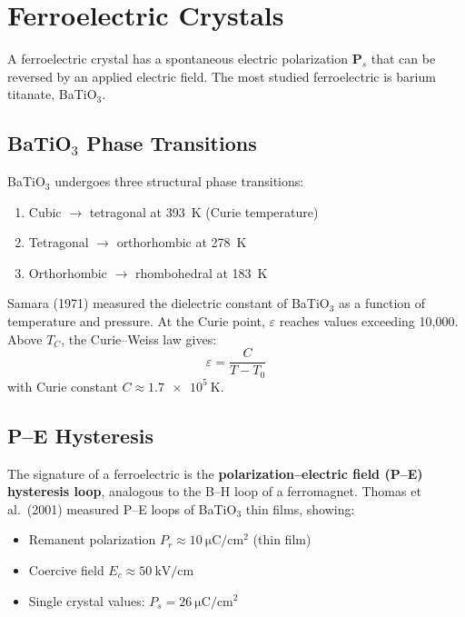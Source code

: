 \section{Ferroelectric Crystals}

A ferroelectric crystal has a spontaneous electric polarization $\mathbf{P}_s$ that can be reversed by an applied electric field. The most studied ferroelectric is barium titanate, BaTiO$_3$.

\subsection{BaTiO$_3$ Phase Transitions}

BaTiO$_3$ undergoes three structural phase transitions:
\begin{enumerate}[nosep]
  \item Cubic $\to$ tetragonal at \SI{393}{\kelvin} (Curie temperature)
  \item Tetragonal $\to$ orthorhombic at \SI{278}{\kelvin}
  \item Orthorhombic $\to$ rhombohedral at \SI{183}{\kelvin}
\end{enumerate}

Samara (1971) measured the dielectric constant of BaTiO$_3$ as a function of temperature and pressure. At the Curie point, $\varepsilon$ reaches values exceeding 10,000. Above $T_C$, the Curie--Weiss law gives:
\begin{equation}
  \varepsilon = \frac{C}{T - T_0}
\end{equation}
with Curie constant $C \approx \SI{1.7e5}{\kelvin}$.

\subsection{P--E Hysteresis}

The signature of a ferroelectric is the \textbf{polarization--electric field (P--E) hysteresis loop}, analogous to the B--H loop of a ferromagnet. Thomas et al.\ (2001) measured P--E loops of BaTiO$_3$ thin films, showing:
\begin{itemize}[nosep]
  \item Remanent polarization $P_r \approx \SI{10}{\micro\coulomb\per\centi\metre\squared}$ (thin film)
  \item Coercive field $E_c \approx \SI{50}{\kilo\volt\per\centi\metre}$
  \item Single crystal values: $P_s = \SI{26}{\micro\coulomb\per\centi\metre\squared}$
\end{itemize}

